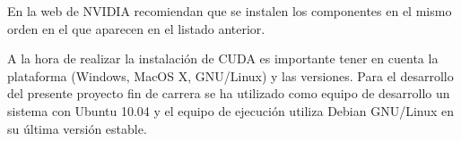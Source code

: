 En la web de NVIDIA recomiendan que se instalen los componentes en el mismo orden en el que aparecen en el listado anterior.

A la hora de realizar la instalación de CUDA es importante tener en cuenta la plataforma (Windows, MacOS X, GNU/Linux) y las versiones. Para el desarrollo del presente proyecto fin de carrera se ha utilizado como equipo de desarrollo un sistema con Ubuntu 10.04 y el equipo de ejecución utiliza Debian GNU/Linux en su última versión estable.
